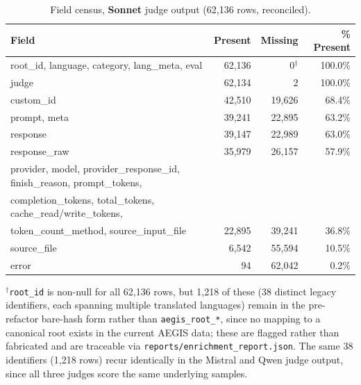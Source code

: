 \begin{table}[t]
\centering
\small
\caption{Field census, \textbf{Sonnet} judge output (62{,}136 rows, reconciled).}
\label{tab:field_census_sonnet}
\begin{tabular}{lrrr}
\toprule
\textbf{Field} & \textbf{Present} & \textbf{Missing} & \textbf{\% Present} \\
\midrule
root\_id, language, category, lang\_meta, eval & 62{,}136 & 0$^{\dagger}$ & 100.0\% \\
judge & 62{,}134 & 2 & 100.0\% \\
custom\_id & 42{,}510 & 19{,}626 & 68.4\% \\
prompt, meta & 39{,}241 & 22{,}895 & 63.2\% \\
response & 39{,}147 & 22{,}989 & 63.0\% \\
response\_raw & 35{,}979 & 26{,}157 & 57.9\% \\
provider, model, provider\_response\_id, finish\_reason, prompt\_tokens, & & & \\
\quad completion\_tokens, total\_tokens, cache\_read/write\_tokens, & & & \\
\quad token\_count\_method, source\_input\_file & 22{,}895 & 39{,}241 & 36.8\% \\
source\_file & 6{,}542 & 55{,}594 & 10.5\% \\
error & 94 & 62{,}042 & 0.2\% \\
\bottomrule
\end{tabular}

\vspace{0.3em}
{\footnotesize $^{\dagger}$\texttt{root\_id} is non-null for all 62{,}136 rows,
but 1{,}218 of these (38 distinct legacy identifiers, each spanning multiple
translated languages) remain in the pre-refactor bare-hash form rather than
\texttt{aegis\_root\_*}, since no mapping to a canonical root exists in the
current AEGIS data; these are flagged rather than fabricated and are
traceable via \texttt{reports/enrichment\_report.json}. The same 38
identifiers (1{,}218 rows) recur identically in the Mistral and Qwen judge
output, since all three judges score the same underlying samples.}
\end{table}
